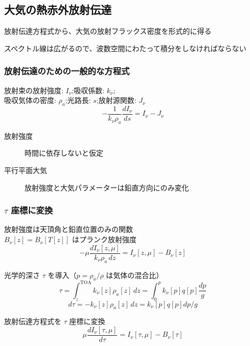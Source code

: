 \documentclass[unicode,colorlinks]{beamer}
\newcommand{\Unit}[1]{\,\mathrm{#1}}
\begin{document}
\begin{frame}
	\section{大気の熱赤外放射伝達}
	放射伝達方程式から、大気の放射フラックス密度を形式的に得る

	スペクトル線は広がるので、波数空間にわたって積分をしなければならない
\end{frame}

% 

\begin{frame}
	\frametitle{放射伝達のための一般的な方程式}
	放射束の放射強度: $I_\nu$;\quad 吸収係数: $k_\nu$;\\
	吸収気体の密度: $\rho_a$;\quad 光路長: $s$;\quad 放射源関数: $J_\nu$
	\[-\frac{1}{k_\nu \rho_a}\frac{dI_\nu}{ds}=I_\nu-J_\nu\]

	\begin{description}
		\item[放射強度] 時間に依存しないと仮定
		\item[平行平面大気] 放射強度と大気パラメーターは鉛直方向にのみ変化
	\end{description}
\end{frame}

\begin{frame}
	\frametitle{$\tau$ 座標に変換}
	放射強度は天頂角と鉛直位置のみの関数\\
	$B_\nu[z]=B_\nu[T[z]]$ はプランク放射強度
	\[-\mu\frac{dI_\nu[z,\mu]}{k_\nu\rho_a\,dz}=I_\nu[z,\mu]-B_\nu[z]\]

	光学的深さ $\tau$ を導入（$p=\rho_a/\rho$ は気体の混合比）
	\[\tau=\int^{\mathrm{TOA}}_{z} k_\nu[z]\rho_a[z]\,dz=\int^p_0 k_\nu[p]q[p]\frac{dp}{g}\]
	\[d\tau=-k_\nu[z]\rho_a[z]\,dz=k_\nu[p]q[p]dp/g\]

	放射伝達方程式を $\tau$ 座標に変換
	\[\mu\frac{dI_\nu[\tau,\mu]}{d\tau}=I_\nu[\tau,\mu]-B_\nu[\tau]\]
\end{frame}
\end{document}
